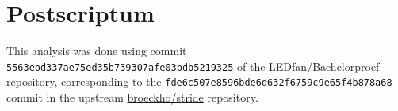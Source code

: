 \documentclass[natbib=true]{acmart}
\begin{document}
\section{Postscriptum}

This analysis was done using commit \texttt{5563ebd337ae75ed35b739307afe03bdb5219325} of the \href{https://github.com/LEDfan/Bachelorproef}{LEDfan/Bachelorproef} repository, corresponding to the \texttt{fde6c507e8596bde6d632f6759c9e65f4b878a68} commit in the upstream \href{https://github.com/broeckho/stride}{broeckho/stride} repository.

\clearpage



\end{document}
